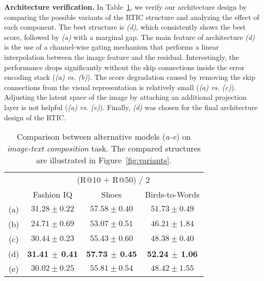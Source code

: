 \documentclass[10pt,twocolumn,letterpaper]{article}
\begin{document}
        
\noindent
\textbf{Architecture verification.} In Table~\ref{tab:structure_analysis}, we verify our architecture design by comparing the possible variants of the RTIC structure and analyzing the effect of each component. The best structure is \textit{(d)}, which consistently shows the best score, followed by \textit{(a)} with a marginal gap. The main feature of architecture \textit{(d)} is the use of a channel-wise gating mechanism that performs a linear interpolation between the image feature and the residual. Interestingly, the performance drops significantly without the skip connections inside the error encoding stack (\textit{(a) vs. (b)}). The score degradation caused by removing the skip connections from the visual representation is relatively small (\textit{(a) vs. (c)}). Adjusting the latent space of the image by attaching an additional projection layer is not helpful (\textit{(a) vs. (e)}). Finally, \textit{(d)} was chosen for the final architecture design of the RTIC.

\begin{table}[h]
    \caption{Comparison between alternative models (\textit{a-e}) on \textit{image-text composition} task. The compared structures are illustrated in Figure~\ref{fig:variants}.}
    \centering
    \begin{adjustbox}{width=0.40\textwidth}
    \begin{tabular}{cccc}
        \toprule
              & \multicolumn{3}{c}{(R@10 + R@50) / 2} \\ \cline{2-4} 
              & Fashion IQ   & Shoes   & Birds-to-Words   \\ \hline \hline
        (a)   & $31.28 \pm 0.22$ & $57.58 \pm 0.40$ & $51.73 \pm 0.49$ \\
        (b)   & $24.71 \pm 0.69$ & $53.07 \pm 0.51$ & $46.21 \pm 1.84$ \\
        (c)   & $30.44 \pm 0.23$ & $55.43 \pm 0.60$ & $48.38 \pm 0.40$ \\
        (d)   & \textbf{31.41 $\pm$ 0.41} & \textbf{57.73 $\pm$ 0.45} & \textbf{52.24 $\pm$ 1.06} \\
        (e)   & $30.02 \pm 0.25$ & $55.81 \pm 0.54$ & $48.42 \pm 1.55$ \\
        \bottomrule
    \end{tabular}
    \end{adjustbox}
    \label{tab:structure_analysis}
    \end{table}
    
\end{document}
